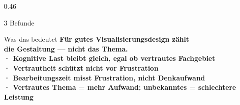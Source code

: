 \documentclass[final]{beamer}
\newcommand{\lw}{0.46\textwidth}
\begin{document}
\begin{frame}[t]{}
\begin{columns}[T]
\begin{column}{\lw}
\begin{block}{3 Befunde}
    \vspace{0.6em}


  \end{block}

  \vspace{0.8em}

  \begin{alertblock}{Was das bedeutet}
    \vspace{0.3em}
    \LARGE\bfseries
    Für gutes Visualisierungsdesign zählt\\
    die Gestaltung — nicht das Thema.\\[0.5em]
    \large\mdseries
    · Kognitive Last bleibt gleich, egal ob vertrautes Fachgebiet\\[0.3em]
    · Vertrautheit schützt nicht vor Frustration\\[0.3em]
    · Bearbeitungszeit misst Frustration, nicht Denkaufwand\\[0.3em]
    · Vertrautes Thema = mehr Aufwand; unbekanntes = schlechtere Leistung
    \vspace{0.3em}
  \end{alertblock}

\end{column}
\end{columns}

\end{frame}
\end{document}

